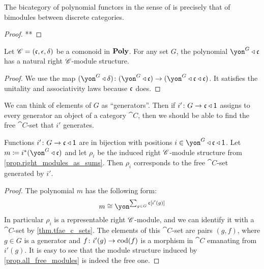 \documentclass[Book-Poly]{subfiles}
\begin{document}
\begin{proposition}
The bicategory of polynomial functors in the sense of \cite{GK} is precisely that of bimodules between discrete categories.
\end{proposition}
\begin{proof}
**
\end{proof}


\begin{proposition}\label{prop.all_free_modules}
Let $\mathscr{C}=(\mathfrak{c},\epsilon,\delta)$ be a comonoid in $\textbf{Poly}$. For any set $G$, the polynomial $\yon^G\tri\ema{c}$ has a natural right $\mathscr{C}$-module structure.
\end{proposition}
\begin{proof}
We use the map $(\yon^G\tri\delta)\colon(\yon^G\tri\ema{c})\to(\yon^G\tri\ema{c}\tri\ema{c})$. It satisfies the unitality and associativity laws because $\mathfrak{c}$ does.
\end{proof}

We can think of elements of $G$ as ``generators''. Then if $i'\colon G\to\mathfrak{c}\mathbin{\triangleleft}\textsf{1}$ assigns to every generator an object of a category $\cat{C}$, then we should be able to find the free $\cat{C}$-set that $i'$ generates.

\begin{proposition}
Functions $i'\colon G\to\mathfrak{c}\mathbin{\triangleleft}\textsf{1}$ are in bijection with positions $i\in\yon^G\tri\ema{c}\tri\1$. Let $m\coloneqq i^*(\yon^G\tri\ema{c})$ and let $\rho_i$ be the induced right $\mathscr{C}$-module structure from \cref{prop.right_modules_as_sums}. Then $\rho_i$ corresponds to the free $\cat{C}$-set generated by $i'$. 
\end{proposition}
\begin{proof}
The polynomial $m$ has the following form:
\[
m\cong\yon^{\sum_{g\in G}\ema{c}[i'(g)]}
\]
In particular $\rho_i$ is a representable right $\mathscr{C}$-module, and we can identify it with a $\cat{C}$-set by \cref{thm.tfae_c_sets}. The elements of this $\cat{C}$-set are pairs $(g, f)$, where $g\in G$ is a generator and $f\colon i'(g)\to\operatorname{cod}(f)$ is a morphism in $\cat{C}$ emanating from $i'(g)$. It is easy to see that the module structure induced by \cref{prop.all_free_modules} is indeed the free one.
\end{proof}
\end{document}
